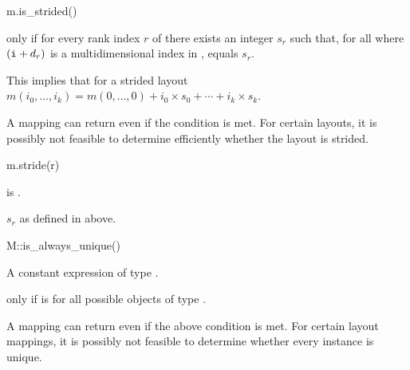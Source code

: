 \begin{itemdecl}
m.is_strided()
\end{itemdecl}

\begin{itemdescr}
\pnum
\result
{}

\pnum
\returns
{} only if
for every rank index $r$ of  there exists an integer $s_r$
such that,
for all  where $(\texttt{i}+d_r)$ is
a multidimensional index in ,
 equals $s_r$.
\begin{note}
This implies that for a strided layout
$m(i_0, \dotsc, i_k) = m(0, \dotsc, 0) + i_0 \times s_0 + \dotsb + i_k \times s_k$.
\end{note}
\begin{note}
A mapping can return  even if the condition is met.
For certain layouts, it is possibly not feasible to determine efficiently
whether the layout is strided.
\end{note}
\end{itemdescr}

\begin{itemdecl}
m.stride(r)
\end{itemdecl}

\begin{itemdescr}
\pnum
\expects
{} is .

\pnum
\result
{}

\pnum
\returns
$s_r$ as defined in  above.
\end{itemdescr}

\begin{itemdecl}
M::is_always_unique()
\end{itemdecl}

\begin{itemdescr}
\pnum
\result
A constant expression of type .

\pnum
\returns
{} only if  is 
for all possible objects  of type .
\begin{note}
A mapping can return  even if the above condition is met.
For certain layout mappings, it is possibly not feasible to determine
whether every instance is unique.
\end{note}
\end{itemdescr}

